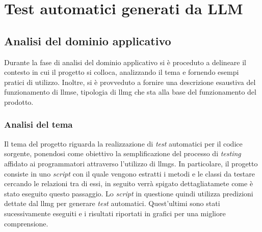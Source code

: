 \chapter{Test automatici generati da LLM}
\label{chap:descrizione-stage-1}
\section{Analisi del dominio applicativo}
Durante la fase di analisi del dominio applicativo si è proceduto a delineare il contesto in cui il progetto si colloca, analizzando il tema e fornendo esempi pratici di utilizzo. Inoltre, si è provveduto a fornire una descrizione esaustiva del funzionamento di \gls{llmse}\glox, tipologia di \gls{llmg} che sta alla base del funzionamento del prodotto.
    \subsection{Analisi del tema}
    Il tema del progetto riguarda la realizzazione di \textit{test} automatici per il codice sorgente, ponendosi come obiettivo la semplificazione del processo di \textit{testing} affidato ai programmatori attraverso l'utilizzo di \glspl{llmg}.
    In particolare, il progetto consiste in uno \textit{script} con il quale vengono estratti i metodi e le classi da testare cercando le relazioni tra di essi, in seguito verrà spigato dettagliatamete come è stato eseguito questo passaggio.
    Lo \textit{script} in questione quindi utilizza predizioni dettate dal \gls{llmg} per generare \textit{test} automatici. Quest'ultimi sono stati sucessivamente eseguiti e i risultati riportati in grafici per una migliore comprensione.  



